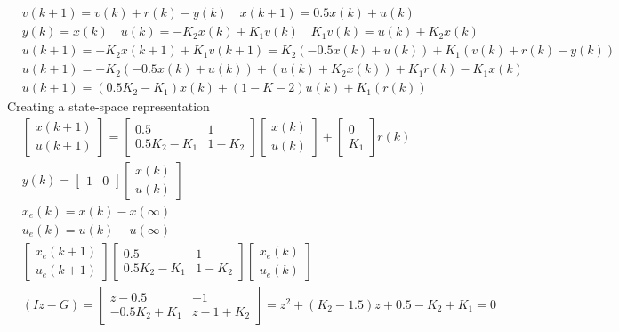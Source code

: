 \vspace*{-1cm}
\begin{align*}
& v(k+1) = v(k) +r(k) - y(k) \quad x(k+1) = 0.5x(k)+u(k) \\
& y(k) = x(k) \quad  u(k) = -K_2 x(k) +K_1 v(k) \quad K_1v(k) =u(k)+K_2x(k) \\
& u(k+1) = -K_2 x(k+1)+K_1 v(k+1) = K_2(-0.5x(k)+u(k)) + K_1(v(k) +r(k) - y(k)) \\
& u(k+1) = -K_2 (-0.5x(k)+u(k)) + (u(k)+K_2x(k)) +K_1 r(k) - K_1x(k) \\
& u(k+1) = (0.5K_2-K_1)x(k)+(1-K-2)u(k)+K_1(r(k)) 
\end{align*}
Creating a state-space representation
\vspace*{-0.25cm}
\begin{align*}
& \begin{bmatrix}
x(k+1) \\
u(k+1)
\end{bmatrix} = \begin{bmatrix}
0.5       &  1 \\
0.5K_2-K_1 & 1-K_2
\end{bmatrix}\begin{bmatrix}
x(k) \\
u(k)
\end{bmatrix} + \begin{bmatrix}
0  \\
K_1
\end{bmatrix} r(k) \\
& y(k) = \begin{bmatrix}
1 & 0
\end{bmatrix}\begin{bmatrix}
x(k) \\
u(k)
\end{bmatrix} \\
& x_e(k) = x(k) - x(\infty) \\
& u_e(k) = u(k) - u(\infty) \\
& \begin{bmatrix}
x_e(k+1) \\
u_e(k+1)
\end{bmatrix}\begin{bmatrix}
0.5        & 1    \\
0.5K_2-K_1 & 1-K_2
\end{bmatrix}\begin{bmatrix}
x_e(k) \\
u_e(k)
\end{bmatrix} \\
& (Iz-G)=\begin{bmatrix}
z-0.5        & -1  \\
-0.5K_2 +K_1 & z-1+K_2
\end{bmatrix}=z^2+(K_2-1.5)z+0.5-K_2+K_1=0
\end{align*}
